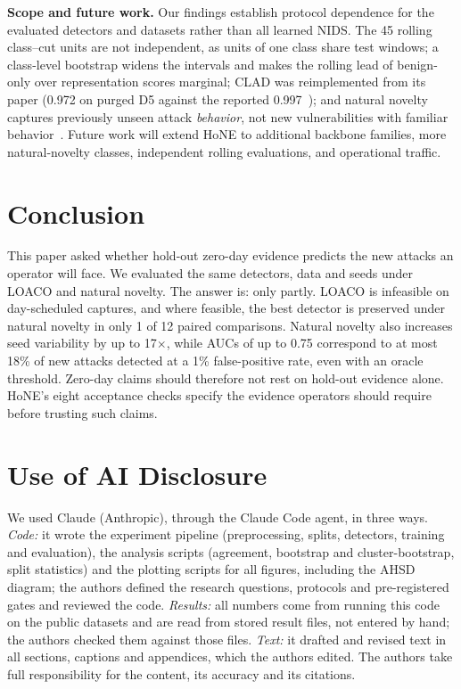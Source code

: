 \documentclass[conference]{IEEEtran}
\begin{document}
\textbf{Scope and future work.} Our findings establish protocol dependence for the evaluated detectors and datasets rather than all learned NIDS. The 45 rolling class--cut units are not independent, as units of one class share test windows; a class-level bootstrap widens the intervals and makes the rolling lead of benign-only over representation scores marginal; CLAD was reimplemented from its paper (0.972 on purged D5 against the reported 0.997~\cite{wilkie2026}); and natural novelty captures previously unseen attack \emph{behavior}, not new vulnerabilities with familiar behavior~\cite{jibunoh2026}. Future work will extend HoNE to additional backbone families, more natural-novelty classes, independent rolling evaluations, and operational traffic.

\section{Conclusion}
\label{sec:concl}

This paper asked whether hold-out zero-day evidence predicts the new attacks an operator will face. We evaluated the same detectors, data and seeds under LOACO and natural novelty. The answer is: only partly. LOACO is infeasible on day-scheduled captures, and where feasible, the best detector is preserved under natural novelty in only 1 of 12 paired comparisons. Natural novelty also increases seed variability by up to 17$\times$, while AUCs of up to 0.75 correspond to at most 18\% of new attacks detected at a 1\% false-positive rate, even with an oracle threshold. Zero-day claims should therefore not rest on hold-out evidence alone. HoNE's eight acceptance checks specify the evidence operators should require before trusting such claims.

\section*{Use of AI Disclosure}
We used Claude (Anthropic), through the Claude Code agent, in three ways. \emph{Code:} it wrote the experiment pipeline (preprocessing, splits, detectors, training and evaluation), the analysis scripts (agreement, bootstrap and cluster-bootstrap, split statistics) and the plotting scripts for all figures, including the AHSD diagram; the authors defined the research questions, protocols and pre-registered gates and reviewed the code. \emph{Results:} all numbers come from running this code on the public datasets and are read from stored result files, not entered by hand; the authors checked them against those files. \emph{Text:} it drafted and revised text in all sections, captions and appendices, which the authors edited. The authors take full responsibility for the content, its accuracy and its citations.



\clearpage

\end{document}
